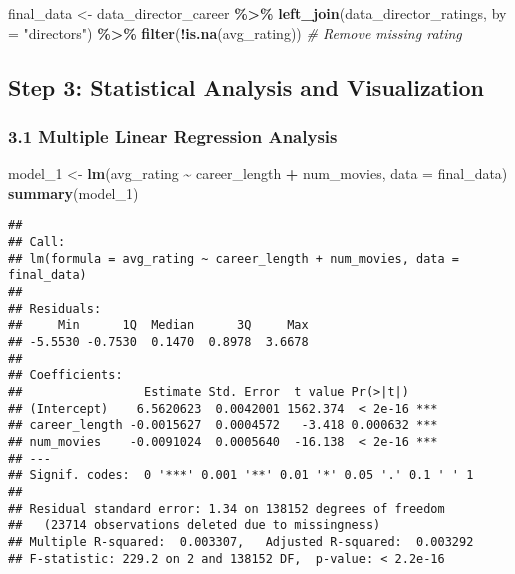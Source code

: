 \documentclass[
]{article}
\newenvironment{Shaded}{\begin{snugshade}}{\end{snugshade}}
\newcommand{\AttributeTok}[1]{\textcolor[rgb]{0.13,0.29,0.53}{#1}}
\newcommand{\CommentTok}[1]{\textcolor[rgb]{0.56,0.35,0.01}{\textit{#1}}}
\newcommand{\FunctionTok}[1]{\textcolor[rgb]{0.13,0.29,0.53}{\textbf{#1}}}
\newcommand{\NormalTok}[1]{#1}
\newcommand{\OtherTok}[1]{\textcolor[rgb]{0.56,0.35,0.01}{#1}}
\newcommand{\SpecialCharTok}[1]{\textcolor[rgb]{0.81,0.36,0.00}{\textbf{#1}}}
\newcommand{\StringTok}[1]{\textcolor[rgb]{0.31,0.60,0.02}{#1}}
\begin{document}
\begin{Shaded}
\begin{Highlighting}[]
\NormalTok{final\_data }\OtherTok{\textless{}{-}}\NormalTok{ data\_director\_career }\SpecialCharTok{\%\textgreater{}\%}
  \FunctionTok{left\_join}\NormalTok{(data\_director\_ratings, }\AttributeTok{by =} \StringTok{"directors"}\NormalTok{) }\SpecialCharTok{\%\textgreater{}\%}
  \FunctionTok{filter}\NormalTok{(}\SpecialCharTok{!}\FunctionTok{is.na}\NormalTok{(avg\_rating))  }\CommentTok{\# Remove missing rating}
\end{Highlighting}
\end{Shaded}

\subsection{Step 3: Statistical Analysis and
Visualization}\label{step-3-statistical-analysis-and-visualization}

\subsubsection{3.1 Multiple Linear Regression
Analysis}\label{multiple-linear-regression-analysis}

\begin{Shaded}
\begin{Highlighting}[]
\NormalTok{model\_1 }\OtherTok{\textless{}{-}} \FunctionTok{lm}\NormalTok{(avg\_rating }\SpecialCharTok{\textasciitilde{}}\NormalTok{ career\_length }\SpecialCharTok{+}\NormalTok{ num\_movies, }\AttributeTok{data =}\NormalTok{ final\_data)}
\FunctionTok{summary}\NormalTok{(model\_1)}
\end{Highlighting}
\end{Shaded}

\begin{verbatim}
## 
## Call:
## lm(formula = avg_rating ~ career_length + num_movies, data = final_data)
## 
## Residuals:
##     Min      1Q  Median      3Q     Max 
## -5.5530 -0.7530  0.1470  0.8978  3.6678 
## 
## Coefficients:
##                 Estimate Std. Error  t value Pr(>|t|)    
## (Intercept)    6.5620623  0.0042001 1562.374  < 2e-16 ***
## career_length -0.0015627  0.0004572   -3.418 0.000632 ***
## num_movies    -0.0091024  0.0005640  -16.138  < 2e-16 ***
## ---
## Signif. codes:  0 '***' 0.001 '**' 0.01 '*' 0.05 '.' 0.1 ' ' 1
## 
## Residual standard error: 1.34 on 138152 degrees of freedom
##   (23714 observations deleted due to missingness)
## Multiple R-squared:  0.003307,   Adjusted R-squared:  0.003292 
## F-statistic: 229.2 on 2 and 138152 DF,  p-value: < 2.2e-16
\end{verbatim}
\end{document}
